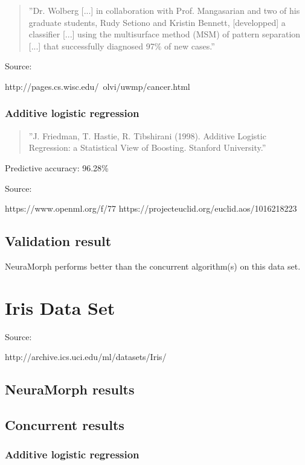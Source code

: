 \documentclass[8pt, a4paper]{article}
\begin{document}
\begin{quote}
''Dr. Wolberg [...] in collaboration with Prof. Mangasarian and two of his graduate students, Rudy Setiono and Kristin Bennett, [developped] a classifier [...] using the multisurface method (MSM) of pattern separation [...] that successfully diagnosed 97\% of new cases.''
\end{quote}

Source:

http://pages.cs.wisc.edu/~olvi/uwmp/cancer.html

\subsubsection{Additive logistic regression}

\begin{quote}
''J. Friedman, T. Hastie, R. Tibshirani (1998). Additive Logistic Regression: a Statistical View of Boosting. Stanford University.''
\end{quote}

Predictive accuracy: 96.28\%

Source:

https://www.openml.org/f/77
https://projecteuclid.org/euclid.aos/1016218223

\subsection{Validation result}

NeuraMorph performs better than the concurrent algorithm(s) on this data set.



\section{Iris Data Set}

Source: 

http://archive.ics.uci.edu/ml/datasets/Iris/

\subsection{NeuraMorph results}

%

\subsection{Concurrent results}

\subsubsection{Additive logistic regression}
\end{document}
